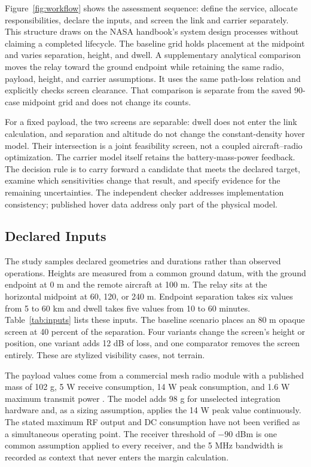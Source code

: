 \documentclass[twocolumn,letterpaper]{IEEEAerospaceCLS}
\begin{document}
Figure~\ref{fig:workflow} shows the assessment sequence: define the service, allocate responsibilities, declare the inputs, and screen the link and carrier separately. This structure draws on the NASA handbook's system design processes \cite{nasaSEH} without claiming a completed lifecycle. The baseline grid holds placement at the midpoint and varies separation, height, and dwell. A supplementary analytical comparison moves the relay toward the ground endpoint while retaining the same radio, payload, height, and carrier assumptions. It uses the same path-loss relation and explicitly checks screen clearance. That comparison is separate from the saved 90-case midpoint grid and does not change its counts.

For a fixed payload, the two screens are separable: dwell does not enter the link calculation, and separation and altitude do not change the constant-density hover model. Their intersection is a joint feasibility screen, not a coupled aircraft--radio optimization. The carrier model itself retains the battery-mass-power feedback. The decision rule is to carry forward a candidate that meets the declared target, examine which sensitivities change that result, and specify evidence for the remaining uncertainties. The independent checker addresses implementation consistency; published hover data address only part of the physical model.

\subsection{Declared Inputs}

The study samples declared geometries and durations rather than observed operations. Heights are measured from a common ground datum, with the ground endpoint at 0 m and the remote aircraft at 100 m. The relay sits at the horizontal midpoint at 60, 120, or 240 m. Endpoint separation takes six values from 5 to 60 km and dwell takes five values from 10 to 60 minutes. Table~\ref{tab:inputs} lists these inputs. The baseline scenario places an 80 m opaque screen at 40 percent of the separation. Four variants change the screen's height or position, one variant adds 12 dB of loss, and one comparator removes the screen entirely. These are stylized visibility cases, not terrain.

The payload values come from a commercial mesh radio module with a published mass of 102 g, 5 W receive consumption, 14 W peak consumption, and 1.6 W maximum transmit power \cite{doodle}. The model adds 98 g for unselected integration hardware and, as a sizing assumption, applies the 14 W peak value continuously. The stated maximum RF output and DC consumption have not been verified as a simultaneous operating point. The receiver threshold of $-90$ dBm is one common assumption applied to every receiver, and the 5 MHz bandwidth is recorded as context that never enters the margin calculation.
\end{document}
